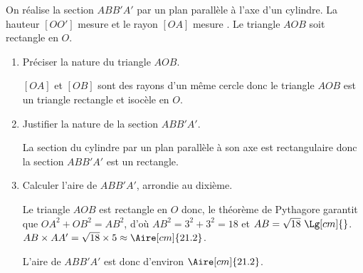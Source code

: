 \begin{corrige}
    On réalise la section $ABB'A'$ par un plan parallèle à l'axe d'un cylindre.
    La hauteur $[OO']$ mesure  et le rayon $[OA]$ 
    mesure . Le triangle $AOB$ soit rectangle en $O$.
    \begin{minipage}{\linewidth}
        \begin{center}
            \scalebox{0.8}{
                \Solide[%
                    Nom=cylindre,%
                    ListeSommets={I,J},%
                    Traces={
                        color A,B,C,D;
                        numeric SLangle;
                        SLangle:=270;
                        D=(\useKV[ClesSolides]{RayonCylindre}*cosd(SLangle),\useKV[ClesSolides]{RayonCylindre}*sind(SLangle),0);
                        C=(\useKV[ClesSolides]{RayonCylindre}*cosd(SLangle+90),\useKV[ClesSolides]{RayonCylindre}*sind(SLangle+90),0);
                        A-D=(0,0,\useKV[ClesSolides]{HauteurCylindre});
                        B-C=(0,0,\useKV[ClesSolides]{HauteurCylindre});
                        trace chemin(A,I,B,A);
                        trace chemin(D,J,C,D) dashed evenly;
                        trace chemin(A,D) dashed evenly;
                        trace chemin(B,C) dashed evenly;
                        trace chemin(I,J) dashed evenly;
                        trace codeperp(A,I,B,5);
                        trace codeperp(D,J,C,5);
                        Label.urt(btex $O$ etex,I);
                        Label.lrt(btex $O'$ etex,J);
                        Label.ulft(btex $A$ etex,A);
                        Label.lrt(btex $B$ etex,B);
                        Label.bot(btex $B'$ etex,C);
                        Label.urt(btex $A'$ etex,D);
                    }
                ]%
            }
        \end{center}
    \end{minipage}
    \begin{enumerate}
        \item Préciser la nature du triangle $AOB$.
        
        {\color{red} $[OA]$ et $[OB]$ sont des rayons d'un même cercle donc le triangle $AOB$ est un triangle rectangle et isocèle en $O$.}
        \item Justifier la nature de la section $ABB'A'$.
        
        {\color{red}La section du cylindre par un plan parallèle à son axe est rectangulaire donc la section $ABB'A'$ est un rectangle.}
        \item Calculer l'aire de $ABB'A'$, arrondie au dixième.
        
        {\color{red}Le triangle $AOB$ est rectangle en $O$ donc, le théorème de Pythagore garantit que $OA^2+OB^2=AB^2$, d'où $AB^2=3^2+3^2=18$ et $AB=\sqrt{18}~\Lg[cm]{}$.        
        $AB\times AA' = \sqrt{18}\times 5 \approx \Aire[cm]{21.2}$.
        
        L'aire de $ABB'A'$ est donc d'environ $\Aire[cm]{21.2}$.
        }
    \end{enumerate}
\end{corrige}

